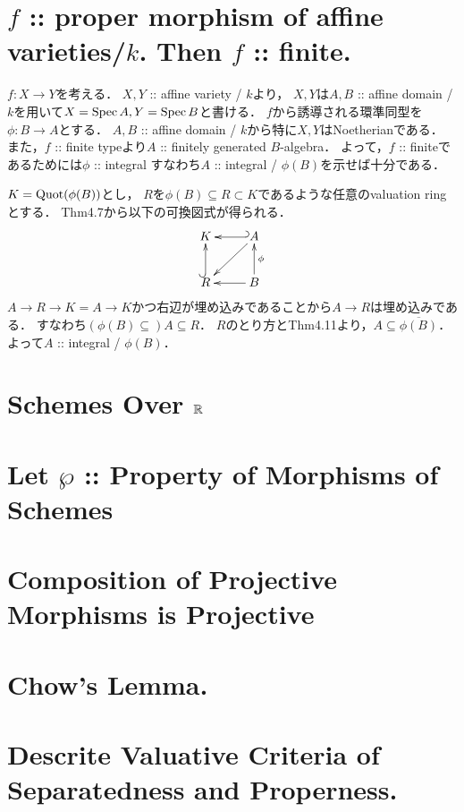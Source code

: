 \documentclass[a4paper]{jsarticle}
\begin{document}
\section{$f$ :: proper morphism of affine varieties/$k$. Then $f$ :: finite.} %
    $f: X \to Y$を考える．
    $X,Y$ :: affine variety / $k$より，
    $X,Y$は$A, B$ :: affine domain / $k$を用いて$X=\operatorname{Spec} A, Y=\operatorname{Spec} B$と書ける．
    $f$から誘導される環準同型を$\phi: B \to A$とする．
    $A, B$ :: affine domain / $k$から特に$X, Y$はNoetherianである．
    また，$f$ :: finite typeより$A$ :: finitely generated $B$-algebra．
    よって，$f$ :: finiteであるためには$\phi$ :: integral
    すなわち$A$ :: integral / $\phi(B)$を示せば十分である．

    $K=\operatorname{Quot}(\phi(B))$とし，
    $R$を$\phi(B) \subseteq R \subset K$であるような任意のvaluation ringとする．
    Thm4.7から以下の可換図式が得られる．
    \[
    \xymatrix
    {
        K  & A \ar@{_{(}->}[l] \ar[ld]\\
        R  \ar@{^{(}->}[u]& B \ar[u]_-{\phi} \ar[l]
    }
    \]
    $A \to R \to K=A \to K$かつ右辺が埋め込みであることから$A \to R$は埋め込みである．
    すなわち$(\phi(B) \subseteq )A \subseteq R$．
    $R$のとり方とThm4.11より，$A \subseteq \overline{\phi(B)}$．
    よって$A$ :: integral / $\phi(B)$．

\section{Schemes Over $\mathbb{R}$} %

\section{Let $\wp$ :: Property of Morphisms of Schemes} %

\section{Composition of Projective Morphisms is Projective} %

\section{Chow's Lemma.} %

\section{Descrite Valuative Criteria of Separatedness and Properness.} %
\end{document}

